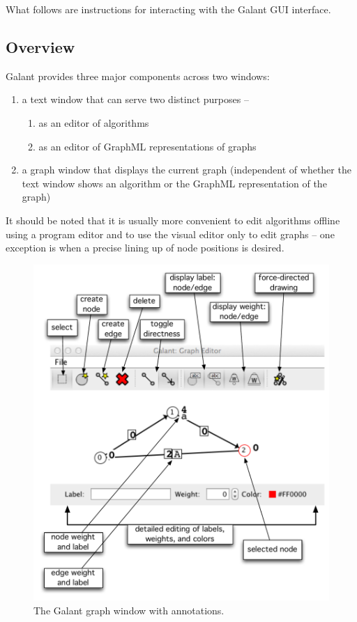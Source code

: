 
What follows are instructions for interacting with the Galant GUI interface.

\subsection{Overview}

Galant provides three major components across two windows:
\begin{enumerate}
\item
a text window that can serve two distinct purposes --
\begin{enumerate}
\item as an editor of algorithms
\item as an editor of GraphML representations of graphs
\end{enumerate}
\item
a graph window that displays the current graph (independent of whether
the text window shows an algorithm or the GraphML representation of the graph)
\end{enumerate}

It should be noted that it is usually more convenient to edit algorithms
offline using a program editor and to use the visual editor only to edit graphs
-- one exception is when a precise lining up of node positions is desired.

\begin{figure}[p!]
\includegraphics[scale=0.5]{X_graph_window_annotated}
\caption{The Galant graph window with annotations.}
\label{fig:graph_window_annotated}
\end{figure}

